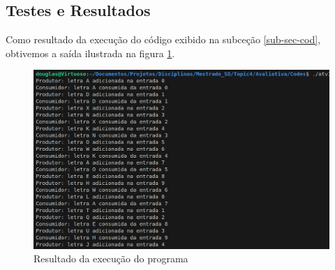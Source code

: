 \documentclass{article}
\begin{document}
\subsection{Testes e Resultados}
Como resultado da execução do código exibido na subceção \ref{sub-sec-cod}, obtivemos a saída ilustrada na figura \ref{fig:exec}.

\begin{figure}[ht]
    \centering
    \includegraphics[width=1\textwidth]{./Images/image.png}
    \caption{Resultado da execução do programa}
    \label{fig:exec}
\end{figure}

\printbibliography %
\end{document}
